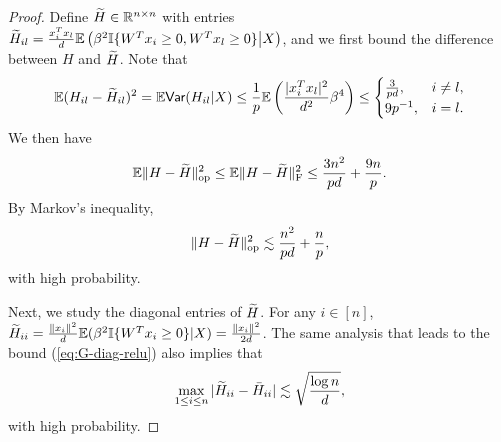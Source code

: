 \begin{proof}
Define $\widetilde{H}\in\mathbb{R}^{n\times n}$ with entries $\widetilde{H}_{il}=\frac{x_i^Tx_l}{d}\mathbb{E}\left(\beta^2\mathbb{I}\{W^Tx_i\geq 0, W^Tx_l\geq 0\}\big|X\right)$, and we first bound the difference between $H$ and $\widetilde{H}$. Note that
$$\mathbb{E}(H_{il}-\wt{H}_{il})^2=\mathbb{E}\Var(H_{il}|X)\leq \frac{1}{p}\mathbb{E}\left(\frac{|x_i^Tx_l|^2}{d^2}\beta^4\right)\leq\begin{cases}
\frac{3}{pd}, & i\neq l, \\
9p^{-1}, & i=l.
\end{cases}$$
We then have
$$\mathbb{E}\|H-\widetilde{H}\|_{\rm op}^2 \leq \mathbb{E}\|H-\widetilde{H}\|_{\rm F}^2 \leq \frac{3n^2}{pd} + \frac{9n}{p}.$$
By Markov's inequality,
\begin{equation}
\opnorm{H-\wt{H}}^2 \lesssim \frac{n^2}{pd} + \frac{n}{p}, \label{eq:H-H-tilde-relu}
\end{equation}
with high probability.

Next, we study the diagonal entries of $\widetilde{H}$. For any $i\in[n]$, $\widetilde{H}_{ii}=\frac{\|x_i\|^2}{d}\mathbb{E}(\beta^2\mathbb{I}\{W^Tx_i\geq 0\}|X)=\frac{\|x_i\|^2}{2d}$. The same analysis that leads to the bound (\ref{eq:G-diag-relu}) also implies that
\begin{equation}
\max_{1\leq i\leq n}|\wt{H}_{ii}-\bar{H}_{ii}|\lesssim \sqrt{\frac{\log n}{d}}, \label{eq:H-diag-relu}
\end{equation}
with high probability.


\end{proof}

